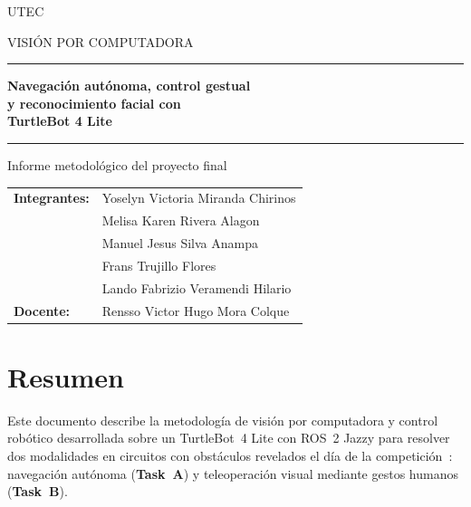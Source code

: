 \documentclass[11pt,a4paper]{article}
\begin{document}
\hypersetup{pageanchor=false}
\begin{titlepage}
  \thispagestyle{empty}
  \centering
  \vspace*{1.0cm}
  {\large UTEC\par}
  \vspace{0.3cm}

  {\color{azul}\large VISIÓN POR COMPUTADORA\par}
  \vspace{0.5cm}
  {\color{azul}\rule{\textwidth}{1pt}\par}
  \vspace{0.65cm}
  {\fontsize{22}{28}\selectfont\bfseries
    Navegación autónoma, control gestual\\
    y reconocimiento facial con\\
    TurtleBot 4 Lite\par}
  \vspace{0.65cm}
  {\color{azul}\rule{\textwidth}{1pt}\par}
  \vspace{1.1cm}
  {\large Informe metodológico del proyecto final\par}
  \vspace{0.35cm}
  \vspace{1.0cm}
  \begin{tabular}{ll}
    \textbf{Integrantes:} & Yoselyn Victoria Miranda Chirinos\\
                     & Melisa Karen Rivera Alagon\\
                     & Manuel Jesus Silva Anampa\\
                     & Frans Trujillo Flores\\
                     & Lando Fabrizio Veramendi Hilario\\[0.6em]
    \textbf{Docente:} & Rensso Victor Hugo Mora Colque\\[0.6em]
  \end{tabular}
  \vfill

  \vspace*{0.4cm}
\end{titlepage}

\hypersetup{pageanchor=true}
\section*{Resumen}

Este documento describe la metodología de visión por computadora y control
robótico desarrollada sobre un TurtleBot~4 Lite con ROS~2 Jazzy para resolver
dos modalidades en circuitos con obstáculos revelados el día de la
competición~\cite{enunciado}: navegación autónoma (\textbf{Task~A}) y
teleoperación visual mediante gestos humanos (\textbf{Task~B}).
\end{document}
